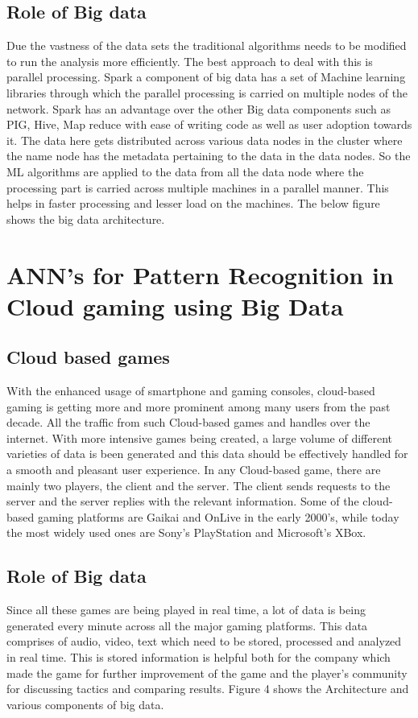 \documentclass[sigconf]{acmart}
\begin{document}
\subsection{Role of Big data}

Due the vastness of the data sets the traditional algorithms needs to be modified to run the analysis more efficiently. The best approach to deal with this is parallel processing. Spark a component of big data has a set of Machine learning libraries through which the parallel processing is carried on multiple nodes of the network. Spark has an advantage over the other Big data components such as PIG, Hive, Map reduce with ease of writing code as well as user adoption towards it. The data here gets distributed across various data nodes in the cluster where the name node has the metadata pertaining to the data in the data nodes. So the ML algorithms are applied to the data from all the data node where the processing part is carried across multiple machines in a parallel manner. This helps in faster processing and lesser load on the machines. The below figure shows the big data architecture. \cite{www-google}


\section{ANN's for Pattern Recognition in Cloud gaming using Big Data}

\subsection{Cloud based games}
With the enhanced usage of smartphone and gaming consoles, cloud-based gaming is getting more and more prominent among many users from the past decade. All the traffic from such Cloud-based games and handles over the internet. With more intensive games being created, a large volume of different varieties of data is been generated and this data should be effectively handled for a smooth and pleasant user experience. In any Cloud-based game, there are mainly two players, the client and the server. The client sends requests to the server and the server replies with the relevant information. Some of the cloud-based gaming platforms are Gaikai and OnLive in the early 2000's, while today the most widely used ones are Sony's PlayStation and Microsoft's XBox.

\subsection{Role of Big data}
Since all these games are being played in real time, a lot of data is being generated every minute across all the major gaming platforms. This data comprises of audio, video, text which need to be stored, processed and analyzed in real time. This is stored information is helpful both for the company which made the game for further improvement of the game and the player's community for discussing tactics and comparing results.
Figure 4 shows the Architecture and various components of big data.
\end{document}
